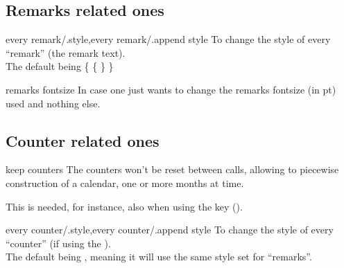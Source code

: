 \documentclass{article}
\begin{document}
%
\subsection{Remarks related ones}
\begin{codedescribe}[key]{every remark/.style,every remark/.append style}
To change the style of every ``remark'' (the remark text).\\ The default being \{  \{  \} \}
\end{codedescribe}

%
\begin{codedescribe}[key]{remarks fontsize}
In case one just wants to change the remarks fontsize (in pt) used and nothing else.
\end{codedescribe}


\subsection{Counter related ones}\label{style:counters}
\begin{codedescribe}[key]{keep counters}
The counters won't be reset between calls, allowing to piecewise construction of a calendar, one or more months at time.
\end{codedescribe}
\begin{tsremark} 
This is needed, for instance, also when using the  key (\tsobj{\setcountingweeks}).
\end{tsremark}

\begin{codedescribe}[key]{every counter/.style,every counter/.append style}
To change the style of every ``counter'' (if using the \tsobj{\setcntweek}).\\ The default being , meaning it will use the same style set for ``remarks''.
\end{codedescribe}
\end{document}
